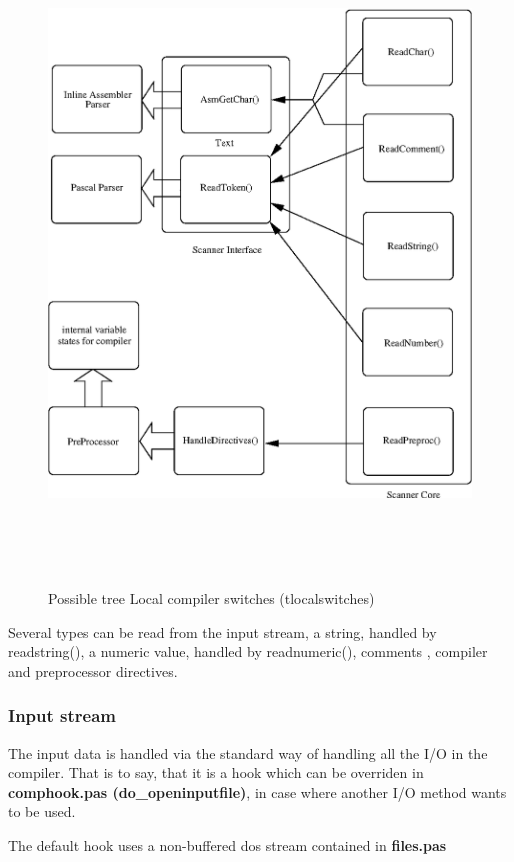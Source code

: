 \documentclass [a4paper,12pt]{article}
\begin{document}
\begin{figure}
\includegraphics[width=5.87in,height=6.90in]{arch2.eps}
\fi
\caption{Possible tree Local compiler switches (tlocalswitches)}
\label{fig2}
\end{figure}

Several types can be read from the input stream, a string, handled by
readstring(), a numeric value, handled by readnumeric(), comments , compiler
and preprocessor directives.

\subsubsection{Input stream}
\label{subsubsec:input}

The input data is handled via the standard way of handling all the I/O in
the compiler. That is to say, that it is a hook which can be overriden in
\textbf{comphook.pas (do{\_}openinputfile)}, in case where another I/O
method wants to be used.

The default hook uses a non-buffered dos stream contained in
\textbf{files.pas}
\end{document}
